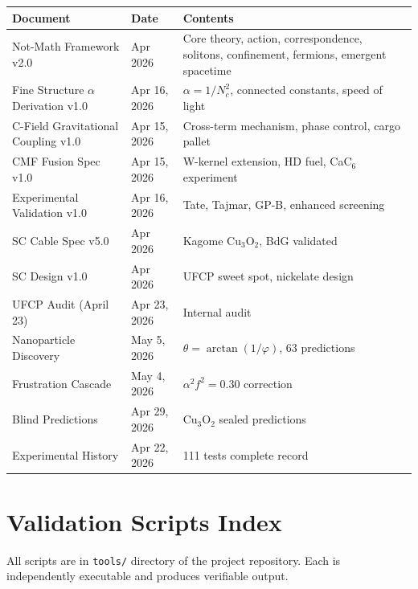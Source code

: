 \documentclass[11pt, a4paper]{article}
\begin{document}
\begin{center}
\begin{longtable}{@{}p{5.5cm}lp{5.5cm}@{}}
\toprule
\textbf{Document} & \textbf{Date} & \textbf{Contents} \\
\midrule
\endhead
Not-Math Framework v2.0 & Apr 2026 & Core theory, action, correspondence,
  solitons, confinement, fermions, emergent spacetime \\
Fine Structure $\alpha$ Derivation v1.0 & Apr 16, 2026 &
  $\alpha = 1/N_c^2$, connected constants, speed of light \\
C-Field Gravitational Coupling v1.0 & Apr 15, 2026 &
  Cross-term mechanism, phase control, cargo pallet \\
CMF Fusion Spec v1.0 & Apr 15, 2026 & W-kernel extension, HD fuel,
  CaC$_6$ experiment \\
Experimental Validation v1.0 & Apr 16, 2026 & Tate, Tajmar, GP-B,
  enhanced screening \\
SC Cable Spec v5.0 & Apr 2026 & Kagome Cu$_3$O$_2$, BdG validated \\
SC Design v1.0 & Apr 2026 & UFCP sweet spot, nickelate design \\
UFCP Audit (April 23) & Apr 23, 2026 & Internal audit \\
Nanoparticle Discovery & May 5, 2026 & $\theta = \arctan(1/\varphi)$,
  63 predictions \\
Frustration Cascade & May 4, 2026 & $\alpha^2 f^2 = 0.30$ correction \\
Blind Predictions & Apr 29, 2026 & Cu$_3$O$_2$ sealed predictions \\
Experimental History & Apr 22, 2026 & 111 tests complete record \\
\bottomrule
\end{longtable}
\end{center}

\section{Validation Scripts Index}

All scripts are in \texttt{tools/} directory of the project
repository. Each is independently executable and produces
verifiable output.
\end{document}
